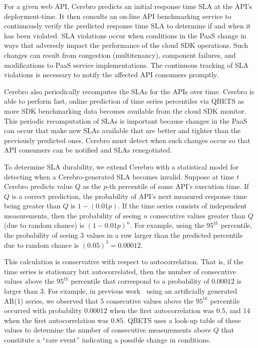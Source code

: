 
For a given web API, Cerebro predicts an initial response time SLA
at the API's deployment-time. It then consults an on-line API benchmarking
service to continuously verify the predicted response time SLA
to determine if and when it has been violated.
SLA violations occur when conditions in the PaaS change in
ways that adversely impact the performance of the cloud SDK operations. 
Such changes can result
from congestion (multitenancy), component failures, and modifications to
PaaS service implementations. The continuous tracking of SLA violations is
necessary to notify the affected API consumers promptly.

Cerebro also periodically recomputes the SLAs for the APIs over time. 
Cerebro is able to perform fast, online
prediction of time series percentiles via QBETS as more SDK benchmarking data becomes 
available from the cloud SDK monitor.
This periodic recomputation of SLAs is important because changes in the PaaS
can occur that make new SLAs available that are better and tighter than the
previously predicted ones. Cerebro must detect when such
changes occur so that API consumers can be notified and SLAs renegotiated.

To determine SLA durability, we extend Cerebro with a 
statistical model for detecting when a Cerebro-generated SLA becomes invalid. 
Suppose at time $t$ Cerebro predicts value $Q$ as the $p$-th percentile of
some API's execution time.  If $Q$ is a correct prediction,
the probability of API's next measured response time being greater than 
$Q$ is $1-(0.01p)$.  If the time series consists of independent
measurements, then the probability of seeing $n$ consecutive values greater
than $Q$ (due to random chance) is $(1-0.01p)^n$. 
For example, using the $95^{th}$ percentile, the probability of seeing $3$
values in a row larger than the predicted percentile due to random chance
is $(0.05)^3 = 0.00012$.

This calculation is conservative with respect to autocorrelation. That is, if
the time series is stationary but autocorrelated, then the number of consecutive 
values above the $95^{th}$ percentile that correspond to a probability of
$0.00012$ is larger than $3$.  For example, in previous
work~\cite{Nurmi:2007:QQB:1791551.1791556}
using an artificially generated AR(1) series, 
we observed that $5$ consecutive values above the $95^{th}$ percentile
occurred with probability $0.00012$ when the first autocorrelation was $0.5$,
and $14$ when the first autocorrelation was $0.85$. QBETS uses a look-up
table of these values to determine the number of consecutive measurements above
$Q$ that constitute a ``rare event'' indicating a possible change in conditions.

